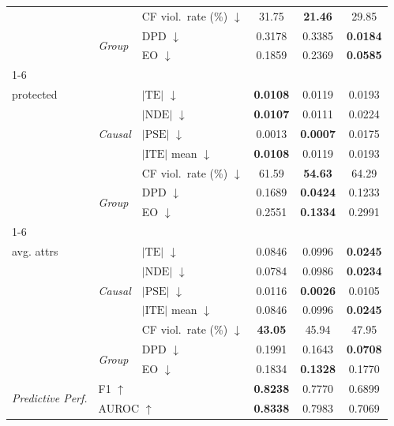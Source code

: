 \begin{table}[t]
\begin{tabular}{@{}lll ccc@{}}
  & & CF viol.\ rate (\%) $\downarrow$ & 31.75 & \textbf{21.46} & 29.85 \\
  & \multirow{2}{*}{\scriptsize\textit{Group}} & DPD $\downarrow$ & 0.3178 & 0.3385 & \textbf{0.0184} \\
  & & EO $\downarrow$ & 0.1859 & 0.2369 & \textbf{0.0585} \\
\cmidrule(lr){1-6}
  \multirow{7}{*}{\makecell[l]{\textit{Citizenship}\\[-2pt]\scriptsize protected}} & \multirow{5}{*}{\scriptsize\textit{Causal}} & $|\mathrm{TE}|$ $\downarrow$ & \textbf{0.0108} & 0.0119 & 0.0193 \\
  & & $|\mathrm{NDE}|$ $\downarrow$ & \textbf{0.0107} & 0.0111 & 0.0224 \\
  & & $|\mathrm{PSE}|$ $\downarrow$ & 0.0013 & \textbf{0.0007} & 0.0175 \\
  & & $|\mathrm{ITE}|$ mean $\downarrow$ & \textbf{0.0108} & 0.0119 & 0.0193 \\
  & & CF viol.\ rate (\%) $\downarrow$ & 61.59 & \textbf{54.63} & 64.29 \\
  & \multirow{2}{*}{\scriptsize\textit{Group}} & DPD $\downarrow$ & 0.1689 & \textbf{0.0424} & 0.1233 \\
  & & EO $\downarrow$ & 0.2551 & \textbf{0.1334} & 0.2991 \\
\cmidrule(lr){1-6}
  \multirow{7}{*}{\makecell[l]{\textit{Overall}\\[-2pt]\scriptsize avg. attrs}} & \multirow{5}{*}{\scriptsize\textit{Causal}} & $|\mathrm{TE}|$ $\downarrow$ & 0.0846 & 0.0996 & \textbf{0.0245} \\
  & & $|\mathrm{NDE}|$ $\downarrow$ & 0.0784 & 0.0986 & \textbf{0.0234} \\
  & & $|\mathrm{PSE}|$ $\downarrow$ & 0.0116 & \textbf{0.0026} & 0.0105 \\
  & & $|\mathrm{ITE}|$ mean $\downarrow$ & 0.0846 & 0.0996 & \textbf{0.0245} \\
  & & CF viol.\ rate (\%) $\downarrow$ & \textbf{43.05} & 45.94 & 47.95 \\
  & \multirow{2}{*}{\scriptsize\textit{Group}} & DPD $\downarrow$ & 0.1991 & 0.1643 & \textbf{0.0708} \\
  & & EO $\downarrow$ & 0.1834 & \textbf{0.1328} & 0.1770 \\
\midrule
\multirow{2}{*}{\textit{Predictive Perf.}} & \multicolumn{2}{l}{F1 $\uparrow$} & \textbf{0.8238} & 0.7770 & 0.6899 \\
  & \multicolumn{2}{l}{AUROC $\uparrow$} & \textbf{0.8338} & 0.7983 & 0.7069 \\
\bottomrule
\end{tabular}
\end{table}